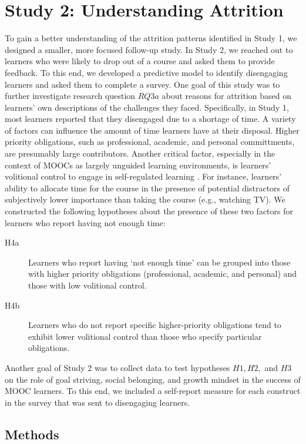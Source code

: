 \documentclass{sigchi}\usepackage[]{graphicx}\usepackage[]{color}
\begin{document}
\section{Study 2: Understanding Attrition}

To gain a better understanding of the attrition patterns identified in Study 1, we designed a smaller, more focused follow-up study. In Study 2, we reached out to learners who were likely to drop out of a course and asked them to provide feedback. To this end, we developed a predictive model to identify disengaging learners and asked them to complete a survey. One goal of this study was to further investigate research question $RQ3a$ about reasons for attrition based on learners' own descriptions of the challenges they faced. Specifically, in Study 1, most learners reported that they disengaged due to a shortage of time. A variety of factors can influence the amount of time learners have at their disposal. Higher priority obligations, such as professional, academic, and personal committments, are presumably large contributors. Another critical factor, especially in the context of MOOCs as largely unguided learning environments, is learners' volitional control to engage in self-regulated learning \cite{corno2001volitional}. For instance, learners' ability to allocate time for the course in the presence of potential distractors of subjectively lower importance than taking the course (e.g., watching TV). We constructed the following hypotheses about the presence of these two factors for learners who report having not enough time:

\begin{description}
  \item[H4a] Learners who report having `not enough time' can be grouped into those with higher priority obligations (professional, academic, and personal) and those with low volitional control.
  \item[H4b] Learners who do not report specific higher-priority obligations tend to exhibit lower volitional control than those who specify particular obligations.
\end{description}  

Another goal of Study 2 was to collect data to test hypotheses $H1, H2,$ and $H3$ on the role of goal striving, social belonging, and growth mindset in the success of MOOC learners. To this end, we included a self-report measure for each construct in the survey that was sent to disengaging learners.

\subsection{Methods}
\end{document}
